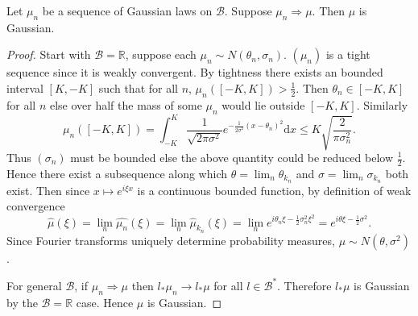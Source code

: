 \documentclass[fontsize=12pt, DIV=10]{scrreprt}
\theoremstyle{remark}
\newcommand{\R}{\mathbb R}
\newcommand{\calB}{\mathcal B}
\newcommand{\dif}[1]{\text{d} #1}
\newcommand{\towk}{\Rightarrow}
\begin{document}
\begin{prop}
	\label{prop:weak-convergence-gaussians}
	Let $\mu_n$ be a sequence of Gaussian laws on $\calB$. Suppose $\mu_n \towk \mu$. Then $\mu$ is Gaussian.
\end{prop}
\begin{proof}
	Start with $\calB = \R$, suppose each $\mu_n \sim N(\theta_n, \sigma_n)$. $(\mu_n)$ is a tight sequence since it is weakly convergent. By tightness there exists an bounded interval $[K, -K]$ such that for all $n$, $\mu_n([-K, K]) > \frac{1}{2}$. Then $\theta_n \in [-K, K]$ for all $n$ else over half the mass of some $\mu_n$ would lie outside $[-K, K]$. Similarly
	\begin{equation}
		\mu_n([-K, K]) = \int_{-K}^K \frac{1}{\sqrt{2 \pi \sigma^2}} e^{-\frac{1}{2\sigma^2}(x - \theta_n)^2} \dif x \leq K \sqrt{\frac{2}{\pi\sigma_n^2}}.
		\end{equation}
		Thus $(\sigma_n)$ must be bounded else the above quantity could be reduced below $\frac{1}{2}$. Hence there exist a subsequence along which $\theta = \lim_n \theta_{k_n}$ and $\sigma = \lim_n \sigma_{k_n}$ both exist. Then since $x \mapsto e^{i \xi x}$ is a continuous bounded function, by definition of weak convergence
	\begin{equation}
		\hat{\mu}(\xi) = \lim_n \hat{\mu_n}(\xi) = \lim_n \hat{\mu}_{k_n}(\xi) = \lim_n e^{i \theta_n \xi - \frac{1}{2} \sigma_n^2 \xi^2} = e^{i \theta \xi - \frac{1}{2} \sigma^2}.
	\end{equation}
	Since Fourier transforms uniquely determine probability measures, $\mu \sim N(\theta, \sigma^2)$.

	For general $\calB$, if $\mu_n \towk \mu$ then $l_* \mu_n \to l_* \mu$ for all $l \in \calB^*$. Therefore $l_* \mu$ is Gaussian by the $\calB = \R$ case. Hence $\mu$ is Gaussian.
\end{proof}
\end{document}
